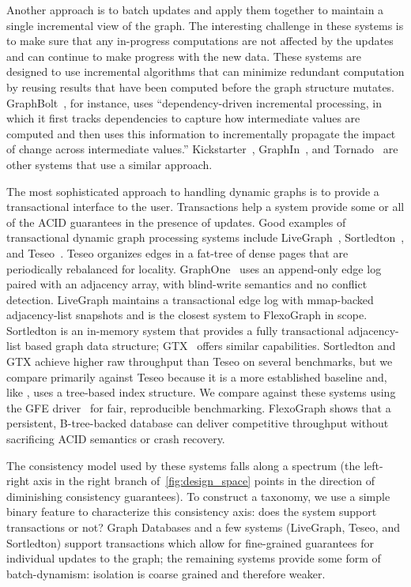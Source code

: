 Another approach is to batch updates and apply them together to maintain a single incremental view of the graph.
The interesting challenge in these systems is to make sure that any in-progress computations are not affected by the updates and can continue to make progress with the new data.
These systems are designed to use incremental algorithms that can minimize redundant computation by reusing results that have been computed before the graph structure mutates.
GraphBolt~\cite{mariappan2019graphbolt}, for instance, uses ``dependency-driven incremental processing, in which it first tracks dependencies to capture how intermediate values are computed and then uses this information to incrementally propagate the impact of change across intermediate values.''
Kickstarter~\cite{vora2017kickstarter}, GraphIn~\cite{sengupta2016graphin}, and Tornado~\cite{shi2016tornado} are other systems that use a similar approach.

The most sophisticated approach to handling dynamic graphs is to provide a transactional interface to the user.
Transactions help a system provide some or all of the ACID guarantees in the presence of updates.
Good examples of transactional dynamic graph processing systems include LiveGraph~\cite{zhu2019livegraph}, Sortledton~\cite{sortledton2022Fuchs}, and Teseo~\cite{teseo2021deLeo}.
Teseo organizes edges in a fat-tree of dense pages that are periodically rebalanced for locality.
GraphOne~\cite{graphone2019kumar} uses an append-only edge log paired with an adjacency array, with blind-write semantics and no conflict detection.
LiveGraph maintains a transactional edge log with mmap-backed adjacency-list snapshots and is the closest system to FlexoGraph in scope.
Sortledton is an in-memory system that provides a fully transactional adjacency-list based graph data structure; GTX~\cite{libinzhou2025GTX} offers similar capabilities.
Sortledton and GTX achieve higher raw throughput than Teseo on several benchmarks, but we compare primarily against Teseo because it is a more established baseline and, like \project{}, uses a tree-based index structure.
We compare against these systems using the GFE driver~\cite{teseo2021deLeo} for fair, reproducible benchmarking.
FlexoGraph shows that a persistent, B-tree-backed database can deliver competitive throughput without sacrificing ACID semantics or crash recovery.

The consistency model used by these systems falls along a spectrum (the left-right axis in the right branch of~\autoref{fig:design_space} points in the direction of diminishing consistency guarantees).
To construct a taxonomy, we use a simple binary feature to characterize this consistency axis: does the system support transactions or not?
Graph Databases and a few systems (LiveGraph, Teseo, and Sortledton) support transactions which allow for fine-grained guarantees for individual updates to the graph; the remaining systems provide some form of batch-dynamism: isolation is coarse grained and therefore weaker.

